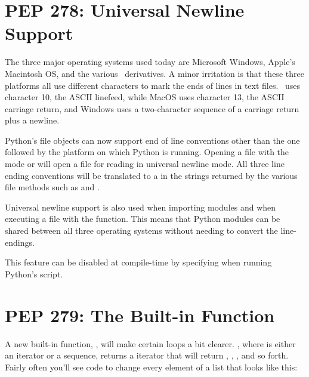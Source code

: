 \documentclass{howto}
\begin{document}
\section{PEP 278: Universal Newline Support}

The three major operating systems used today are Microsoft Windows,
Apple's Macintosh OS, and the various \UNIX\ derivatives.  A minor
irritation is that these three platforms all use different characters
to mark the ends of lines in text files.  \UNIX\ uses character 10,
the ASCII linefeed, while MacOS uses character 13, the ASCII carriage
return, and Windows uses a two-character sequence of a carriage return
plus a newline.

Python's file objects can now support end of line conventions other
than the one followed by the platform on which Python is running.
Opening a file with the mode  or  will open a file
for reading in universal newline mode.  All three line ending
conventions will be translated to a  in the strings
returned by the various file methods such as  and
. 

Universal newline support is also used when importing modules and when
executing a file with the  function.  This means
that Python modules can be shared between all three operating systems
without needing to convert the line-endings.

This feature can be disabled at compile-time by specifying 
 when running Python's
 script.

\begin{seealso}


\end{seealso}


\section{PEP 279: The  Built-in Function\label{section-enumerate}}

A new built-in function, , will make
certain loops a bit clearer.  , where
 is either an iterator or a sequence, returns a iterator
that will return , , , and so forth.  Fairly
often you'll see code to change every element of a list that looks
like this:
\end{document}

